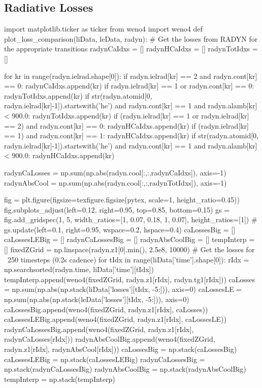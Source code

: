 \subsection{Radiative Losses}
\begin{pycode}[TimeDepRT]
import matplotlib.ticker as ticker
from weno4 import weno4
def plot_loss_comparison(liData, leData, radyn):
    # Get the losses from RADYN for the appropriate transitions
    radynCaIdxs = []
    radynHCaIdxs = []
    radynTotIdxs = []

    for kr in range(radyn.ielrad.shape[0]):
        if radyn.ielrad[kr] == 2 and radyn.cont[kr] == 0:
            radynCaIdxs.append(kr)
        if radyn.ielrad[kr] == 1 or radyn.cont[kr] == 0:
            radynTotIdxs.append(kr)
        if str(radyn.atomid[0, radyn.ielrad[kr]-1]).startswith('he') and radyn.cont[kr] == 1 and radyn.alamb[kr] < 900.0:
            radynTotIdxs.append(kr)
        if (radyn.ielrad[kr] == 1 or radyn.ielrad[kr] == 2) and radyn.cont[kr] == 0:
            radynHCaIdxs.append(kr)
        if (radyn.ielrad[kr] == 1) and radyn.cont[kr] == 1:
            radynHCaIdxs.append(kr)
        if str(radyn.atomid[0, radyn.ielrad[kr]-1]).startswith('he') and radyn.cont[kr] == 1 and radyn.alamb[kr] < 900.0:
            radynHCaIdxs.append(kr)

    radynCaLosses = np.sum(np.abs(radyn.cool[:,:,radynCaIdxs]), axis=-1)
    radynAbsCool = np.sum(np.abs(radyn.cool[:,:,radynTotIdxs]), axis=-1)

    fig = plt.figure(figsize=texfigure.figsize(pytex, scale=1, height_ratio=0.45))
    fig.subplots_adjust(left=0.12, right=0.95, top=0.85, bottom=0.15)
    gs = fig.add_gridspec(1, 5, width_ratios=[1, 0.07, 0.18, 1, 0.07], height_ratios=[1])
#     gs.update(left=0.1, right=0.95, wspace=0.2, hspace=0.4)
    caLossesBig = []
    caLossesLEBig = []
    radynCaLossesBig = []
    radynAbsCoolBig = []
    tempInterp = []
    fixedZGrid = np.linspace(radyn.z1[0].min(), 2.5e8, 10000)
    # Get the losses for ~250 timesteps (0.2s cadence)
    for tIdx in range(liData['time'].shape[0]):
        rIdx = np.searchsorted(radyn.time, liData['time'][tIdx])
        tempInterp.append(weno4(fixedZGrid, radyn.z1[rIdx], radyn.tg1[rIdx]))
        caLosses = np.sum(np.abs(np.stack(liData['losses'][tIdx, -5:])), axis=0)
        caLossesLE = np.sum(np.abs(np.stack(leData['losses'][tIdx, -5:])), axis=0)
        caLossesBig.append(weno4(fixedZGrid, radyn.z1[rIdx], caLosses))
        caLossesLEBig.append(weno4(fixedZGrid, radyn.z1[rIdx], caLossesLE))
        radynCaLossesBig.append(weno4(fixedZGrid, radyn.z1[rIdx], radynCaLosses[rIdx]))
        radynAbsCoolBig.append(weno4(fixedZGrid, radyn.z1[rIdx], radynAbsCool[rIdx]))
    caLossesBig = np.stack(caLossesBig)
    caLossesLEBig = np.stack(caLossesLEBig)
    radynCaLossesBig = np.stack(radynCaLossesBig)
    radynAbsCoolBig = np.stack(radynAbsCoolBig)
    tempInterp = np.stack(tempInterp)


\end{pycode}
